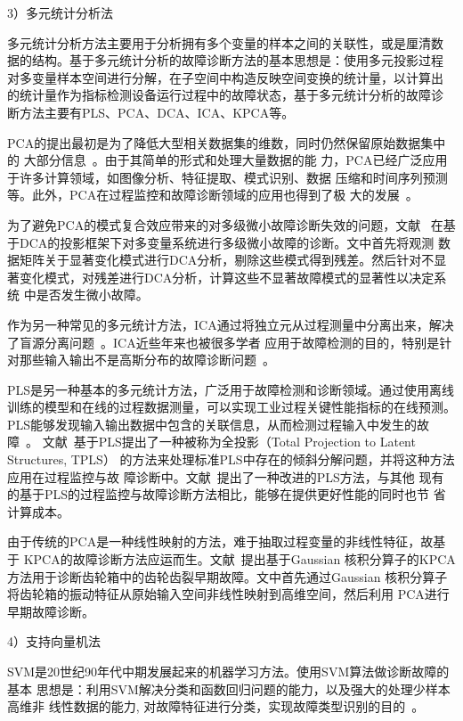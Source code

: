 3）多元统计分析法

多元统计分析方法主要用于分析拥有多个变量的样本之间的关联性，或是厘清数
据的结构。基于多元统计分析的故障诊断方法的基本思想是：使用多元投影过程
对多变量样本空间进行分解，在子空间中构造反映空间变换的统计量，以计算出
的统计量作为指标检测设备运行过程中的故障状态，基于多元统计分析的故障诊
断方法主要有PLS、PCA、DCA、ICA、KPCA等。

PCA的提出最初是为了降低大型相关数据集的维数，同时仍然保留原始数据集中的
大部分信息~\cite{abdi2010principal}。由于其简单的形式和处理大量数据的能
力，PCA已经广泛应用于许多计算领域，如图像分析、特征提取、模式识别、数据
压缩和时间序列预测等。此外，PCA在过程监控和故障诊断领域的应用也得到了极
大的发展~\cite{joe2003statistical, gertler2004pca, choqueuse2012diagnosis}。

为了避免PCA的模式复合效应带来的对多级微小故障诊断失效的问题，文献~
在基于DCA的投影框架下对多变量系统进行多级微小故障的诊断。文中首先将观测
数据矩阵关于显著变化模式进行DCA分析，剔除这些模式得到残差。然后针对不显
著变化模式，对残差进行DCA分析，计算这些不显著故障模式的显著性以决定系统
中是否发生微小故障。

作为另一种常见的多元统计方法，ICA通过将独立元从过程测量中分离出来，解决
了盲源分离问题~\cite{hyvarinen2004independent}。ICA近些年来也被很多学者
应用于故障检测的目的，特别是针对那些输入输出不是高斯分布的故障诊断问题~\cite{kano2003monitoring, lee2004statistical}。

PLS是另一种基本的多元统计方法，广泛用于故障检测和诊断领域。通过使用离线
训练的模型和在线的过程数据测量，可以实现工业过程关键性能指标的在线预测。
PLS能够发现输入输出数据中包含的关联信息，从而检测过程输入中发生的故障~\cite{li2010geometric, zhang2010decentralized, muradore2012pls}。
文献~基于PLS提出了一种被称为全投影（Total Projection to Latent Structures, TPLS）
的方法来处理标准PLS中存在的倾斜分解问题，并将这种方法应用在过程监控与故
障诊断中。文献~提出了一种改进的PLS方法，与其他
现有的基于PLS的过程监控与故障诊断方法相比，能够在提供更好性能的同时也节
省计算成本。

由于传统的PCA是一种线性映射的方法，难于抽取过程变量的非线性特征，故基于
KPCA的故障诊断方法应运而生。文献~提出基于Gaussian
核积分算子的KPCA方法用于诊断齿轮箱中的齿轮齿裂早期故障。文中首先通过Gaussian
核积分算子将齿轮箱的振动特征从原始输入空间非线性映射到高维空间，然后利用
PCA进行早期故障诊断。

4）支持向量机法

SVM是20世纪90年代中期发展起来的机器学习方法。使用SVM算法做诊断故障的基本
思想是：利用SVM解决分类和函数回归问题的能力，以及强大的处理少样本高维非
线性数据的能力, 对故障特征进行分类，实现故障类型识别的目的~\cite{huqiao2006improved}。


